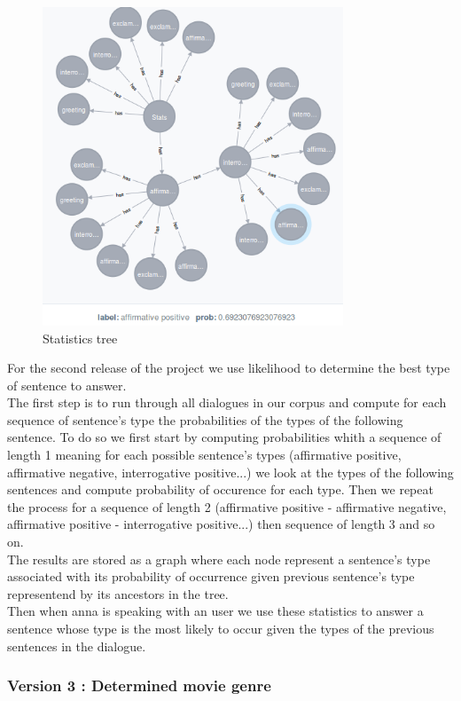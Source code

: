 \begin{figure}[!h]
\begin{center}
\includegraphics[width=0.80\textwidth]{./img/stats.png}
\end{center}
\caption{Statistics tree}
\label{fig:stats}
\end{figure}

For the second release of the project we use likelihood to determine the best type of sentence to answer.\\
The first step is to run through all dialogues in our corpus and compute for each sequence of sentence's type the probabilities of the types of the following sentence. To do so we first start by computing probabilities whith a sequence of length 1 meaning for each possible sentence's types (affirmative positive, affirmative negative, interrogative positive...) we look at the types of the following sentences and compute probability of occurence for each type. Then we repeat the process for a sequence of length 2 (affirmative positive - affirmative negative, affirmative positive - interrogative positive...) then sequence of length 3 and so on.\\
The results are stored as a graph where each node represent a sentence's type associated with its probability of occurrence given previous sentence's type representend by its ancestors in the tree.\\
Then when anna is speaking with an user we use these statistics to answer a sentence whose type is the most likely to occur given the types of the previous sentences in the dialogue.

\subsubsection{Version 3 : Determined movie genre}
\label{sssec:v_genre}
